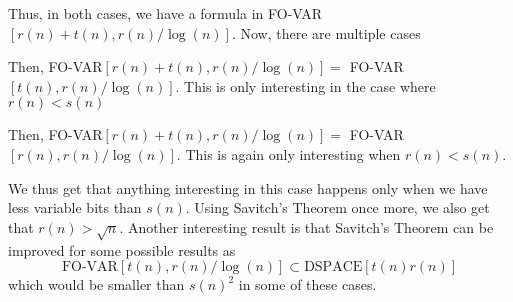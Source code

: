 Thus, in both cases, we have a formula in FO-VAR$[r(n) + t(n), r(n)/\log(n)]$.
Now, there are multiple cases
\begin{description}
    \setlength\itemsep{0.2em}
    \item[$r(n) \leq t(n)$]  Then, FO-VAR$[r(n) + t(n), r(n)/\log(n)] =$ FO-VAR$[t(n), r(n)/\log(n)]$.
    This is only interesting in the case where $r(n) < s(n)$
    \item[$r(n) > t(n)$] Then, FO-VAR$[r(n) + t(n), r(n)/\log(n)] =$ FO-VAR$[r(n), r(n)/\log(n)]$.
    This is again only interesting when $r(n) < s(n)$.
\end{description}

We thus get that anything interesting in this case happens only when we have less variable bits than $s(n)$.
Using Savitch's Theorem once more, we also get that $r(n) > \sqrt{n}$.
Another interesting result is that Savitch's Theorem can be improved for some possible results as
\[
    \text{FO-VAR}[t(n), r(n)/\log(n)] \subset \text{DSPACE}[t(n)r(n)]
\]
which would be smaller than $s(n)^2$ in some of these cases.